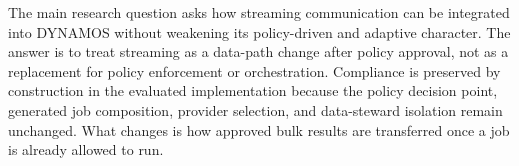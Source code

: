 The main research question asks how streaming communication can be integrated into DYNAMOS without weakening its policy-driven and adaptive character. The answer is to treat streaming as a data-path change after policy approval, not as a replacement for policy enforcement or orchestration. Compliance is preserved by construction in the evaluated implementation because the policy decision point, generated job composition, provider selection, and data-steward isolation remain unchanged. What changes is how approved bulk results are transferred once a job is already allowed to run.

